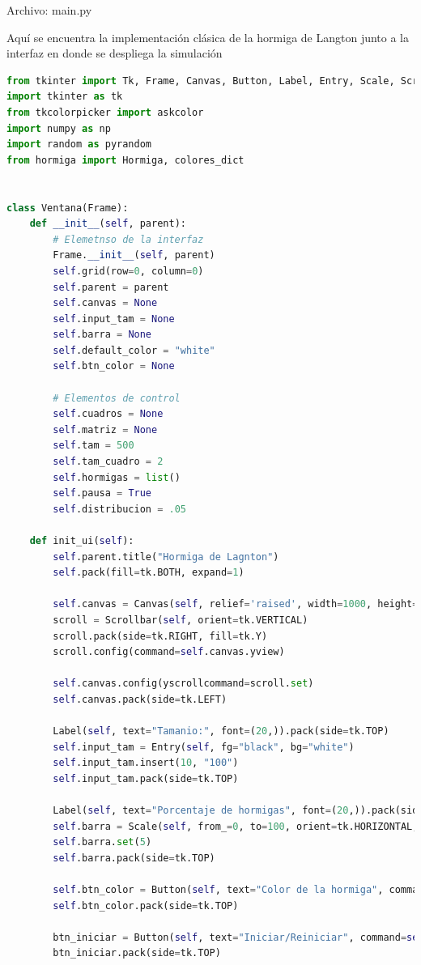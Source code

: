 Archivo: main.py

Aquí se encuentra la implementación clásica de la hormiga de Langton junto a la interfaz en donde se despliega la simulación
\begin{lstlisting}[language=Python]
from tkinter import Tk, Frame, Canvas, Button, Label, Entry, Scale, Scrollbar
import tkinter as tk
from tkcolorpicker import askcolor
import numpy as np
import random as pyrandom
from hormiga import Hormiga, colores_dict


class Ventana(Frame):
    def __init__(self, parent):
        # Elemetnso de la interfaz
        Frame.__init__(self, parent)
        self.grid(row=0, column=0)
        self.parent = parent
        self.canvas = None
        self.input_tam = None
        self.barra = None
        self.default_color = "white"
        self.btn_color = None

        # Elementos de control
        self.cuadros = None
        self.matriz = None
        self.tam = 500
        self.tam_cuadro = 2
        self.hormigas = list()
        self.pausa = True
        self.distribucion = .05

    def init_ui(self):
        self.parent.title("Hormiga de Lagnton")
        self.pack(fill=tk.BOTH, expand=1)

        self.canvas = Canvas(self, relief='raised', width=1000, height=1000)
        scroll = Scrollbar(self, orient=tk.VERTICAL)
        scroll.pack(side=tk.RIGHT, fill=tk.Y)
        scroll.config(command=self.canvas.yview)

        self.canvas.config(yscrollcommand=scroll.set)
        self.canvas.pack(side=tk.LEFT)

        Label(self, text="Tamanio:", font=(20,)).pack(side=tk.TOP)
        self.input_tam = Entry(self, fg="black", bg="white")
        self.input_tam.insert(10, "100")
        self.input_tam.pack(side=tk.TOP)

        Label(self, text="Porcentaje de hormigas", font=(20,)).pack(side=tk.TOP)
        self.barra = Scale(self, from_=0, to=100, orient=tk.HORIZONTAL, tickinterval=50)
        self.barra.set(5)
        self.barra.pack(side=tk.TOP)

        self.btn_color = Button(self, text="Color de la hormiga", command=self.get_color, bg=self.default_color)
        self.btn_color.pack(side=tk.TOP)

        btn_iniciar = Button(self, text="Iniciar/Reiniciar", command=self.iniciar, font=(20,))
        btn_iniciar.pack(side=tk.TOP)


\end{lstlisting}
